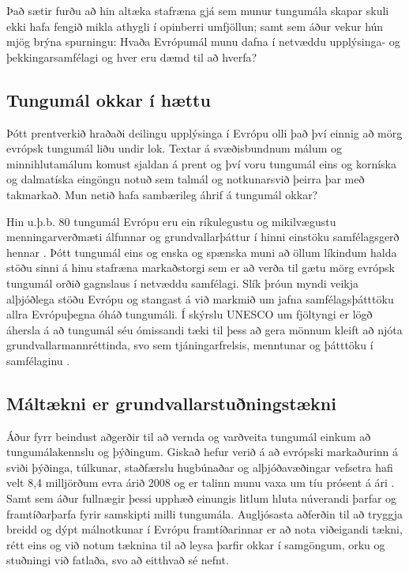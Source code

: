 \begin{multicols}{2}
Það sætir furðu að hin altæka stafræna gjá sem munur tungumála skapar skuli ekki hafa fengið mikla athygli í opinberri umfjöllun; samt sem áður vekur hún mjög brýna spurningu: Hvaða Evrópumál munu dafna í netvæddu upplýsinga- og þekkingarsamfélagi og hver eru dæmd til að hverfa?

\subsection{Tungumál okkar í hættu}

Þótt prentverkið hraðaði deilingu upplýsinga í Evrópu olli það því einnig að mörg evrópsk tungumál liðu undir lok. Textar á svæðisbundnum málum og minnihlutamálum komust sjaldan á prent og því voru tungumál eins og korníska og dalmatíska eingöngu notuð sem talmál og notkunarsvið þeirra þar með takmarkað. Mun netið hafa sambærileg áhrif á tungumál okkar? 

Hin u.þ.b. 80 tungumál Evrópu eru ein ríkulegustu og mikilvægustu menningarverðmæti álfunnar og grundvallarþáttur í hinni einstöku samfélagsgerð hennar \cite{EC2}. Þótt tungumál eins og enska og spænska muni að öllum líkindum halda stöðu sinni á hinu stafræna markaðstorgi sem er að verða til gætu mörg evrópsk tungumál orðið gagnslaus í netvæddu samfélagi. Slík þróun myndi veikja alþjóðlega stöðu Evrópu og stangast á við markmið um jafna samfélagsþátttöku allra Evrópuþegna óháð tungumáli.
Í skýrslu UNESCO um fjöltyngi er lögð áhersla á að tungumál séu ómissandi tæki til þess að gera mönnum kleift að njóta grundvallarmannréttinda, svo sem tjáningarfrelsis, menntunar og þátttöku í samfélaginu \cite{Unesco1}.

\subsection{Máltækni er grund\-vallar\-stuðningstækni}

Áður fyrr beindust aðgerðir til að vernda og varðveita tungumál einkum að tungumálakennslu og þýðingum. Giskað hefur verið á að evrópski markaðurinn á sviði þýðinga, túlkunar, staðfærslu hugbúnaðar og alþjóðavæðingar vefsetra hafi velt 8,4 milljörðum evra árið 2008 og er talinn munu vaxa um tíu prósent á ári \cite{EC3}. Samt sem áður fullnægir þessi upphæð einungis litlum hluta núverandi þarfar og framtíðarþarfa fyrir samskipti milli tungumála. Augljósasta aðferðin til að tryggja breidd og dýpt málnotkunar í Evrópu framtíðarinnar er að nota viðeigandi tækni, rétt eins og við notum tæknina til að leysa þarfir okkar í samgöngum, orku og stuðningi við fatlaða, svo að eitthvað sé nefnt. 


\end{multicols}
